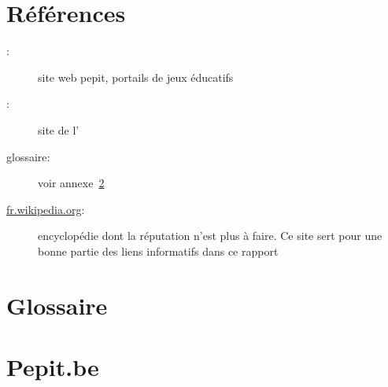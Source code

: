 \chapter{Références}
\begin{description}
	\item[\pepitSite{}:] site web pepit, portails de jeux éducatifs
	\item[\siteulco{}:] site de l'\ulco
	\item[glossaire:] voir annexe~\ref{annexe_glossaire}
	\item[\href{http://fr.wikipedia.org/}{fr.wikipedia.org}:] encyclopédie dont la réputation n'est plus à faire. Ce site sert pour une bonne partie des \og{}liens informatifs\fg{} dans ce rapport
\end{description}


\chapter{Glossaire}
\label{annexe_glossaire}



%
%
%

\chapter{Pepit.be}

